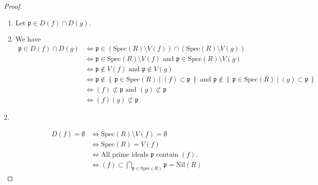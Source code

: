 \documentclass[a4paper]{book}
\theoremstyle{definition}
\newcommand{\makeset}[2]{\left\{\, #1 \mid #2 \,\right\}}
\begin{document}
\begin{proof}
    \begin{enumerate}
        \item Let \(\mathfrak{p} \in D(f) \cap D(g)\).
        \item We have \begin{align*}
            \mathfrak{p} \in D(f) \cap D(g) &\iff \mathfrak{p} \in (\text{Spec}(R) \setminus V(f)) \cap (\text{Spec}(R) \setminus V(g)) \\
            &\iff \mathfrak{p} \in \text{Spec}(R) \setminus V(f) \text{ and } \mathfrak{p} \in \text{Spec}(R) \setminus V(g) \\
            &\iff \mathfrak{p} \not\in V(f) \text{ and } \mathfrak{p} \not\in V(g) \\
            &\iff \mathfrak{p} \not\in \makeset{\mathfrak{p} \in \text{Spec}(R)}{(f) \subset \mathfrak{p}} \text{ and } \mathfrak{p} \not\in \makeset{\mathfrak{p} \in \text{Spec}(R)}{(g) \subset \mathfrak{p}} \\
            &\iff (f) \not\subset \mathfrak{p} \text{ and } (g) \not\subset \mathfrak{p} \\
            &\iff (f)(g) \not\subset \mathfrak{p}
        \end{align*}
    \end{enumerate}

    2.

    \begin{align*}
        D(f) = \emptyset &\iff \text{Spec}(R) \setminus V(f) = \emptyset\\
        &\iff \text{Spec}(R) = V(f) \\
        &\iff \text{All prime ideals \(\mathfrak{p}\) contain \((f)\)}. \\
        &\iff (f) \subset \bigcap_{\mathfrak{p} \in \text{Spec}(R)}\mathfrak{p} = \text{Nil}(R)
    \end{align*}
\end{proof}
\end{document}
